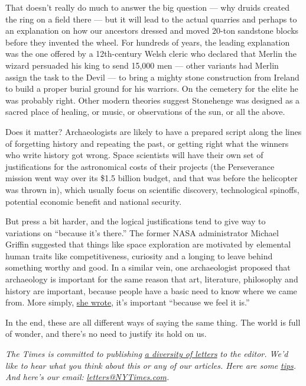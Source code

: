 That doesn't really do much to answer the big question --- why druids
created the ring on a field there --- but it will lead to the actual
quarries and perhaps to an explanation on how our ancestors dressed and
moved 20-ton sandstone blocks before they invented the wheel. For
hundreds of years, the leading explanation was the one offered by a
12th-century Welsh cleric who declared that Merlin the wizard persuaded
his king to send 15,000 men --- other variants had Merlin assign the
task to the Devil --- to bring a mighty stone construction from Ireland
to build a proper burial ground for his warriors. On the cemetery for
the elite he was probably right. Other modern theories suggest
Stonehenge was designed as a sacred place of healing, or music, or
observations of the sun, or all the above.

Does it matter? Archaeologists are likely to have a prepared script
along the lines of forgetting history and repeating the past, or getting
right what the winners who write history got wrong. Space scientists
will have their own set of justifications for the astronomical costs of
their projects (the Perseverance mission went way over its \$1.5 billion
budget, and that was before the helicopter was thrown in), which usually
focus on scientific discovery, technological spinoffs, potential
economic benefit and national security.

But press a bit harder, and the logical justifications tend to give way
to variations on ``because it's there.'' The former NASA administrator
Michael Griffin suggested that things like space exploration are
motivated by elemental human traits like competitiveness, curiosity and
a longing to leave behind something worthy and good. In a similar vein,
one archaeologist proposed that archaeology is important for the same
reason that art, literature, philosophy and history are important,
because people have a basic need to know where we came from. More
simply,
\href{https://pahistoricpreservation.com/why-is-archaeology-important/}{she
wrote}, it's important ``because we feel it is.''

In the end, these are all different ways of saying the same thing. The
world is full of wonder, and there's no need to justify its hold on us.

\emph{The Times is committed to publishing}
\href{https://www.nytimes3xbfgragh.onion/2019/01/31/opinion/letters/letters-to-editor-new-york-times-women.html}{\emph{a
diversity of letters}} \emph{to the editor. We'd like to hear what you
think about this or any of our articles. Here are some}
\href{https://help.nytimes3xbfgragh.onion/hc/en-us/articles/115014925288-How-to-submit-a-letter-to-the-editor}{\emph{tips}}\emph{.
And here's our email:}
\href{mailto:letters@NYTimes.com}{\emph{letters@NYTimes.com}}\emph{.}

